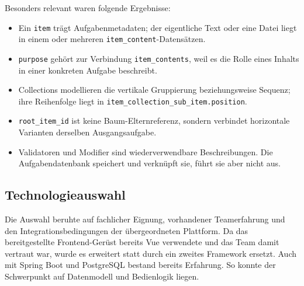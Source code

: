 \documentclass[11pt,a4paper]{article}
\begin{document}
Besonders relevant waren folgende Ergebnisse:
\begin{itemize}
\item Ein \texttt{item} trägt Aufgabenmetadaten; der eigentliche Text oder
eine Datei liegt in einem oder mehreren \texttt{item\_content}-Datensätzen.
\item \texttt{purpose} gehört zur Verbindung
\texttt{item\_contents}, weil es die Rolle eines Inhalts in einer konkreten
Aufgabe beschreibt.
\item Collections modellieren die vertikale Gruppierung beziehungsweise
Sequenz; ihre Reihenfolge liegt in
\texttt{item\_collection\_sub\_item.position}.
\item \texttt{root\_item\_id} ist keine Baum-Elternreferenz, sondern verbindet
horizontale Varianten derselben Ausgangsaufgabe.
\item Validatoren und Modifier sind wiederverwendbare Beschreibungen. Die
Aufgabendatenbank speichert und verknüpft sie, führt sie aber nicht aus.
\end{itemize}

\subsection{Technologieauswahl}
Die Auswahl beruhte auf fachlicher Eignung, vorhandener Teamerfahrung und den
Integrationsbedingungen der übergeordneten Plattform. Da das bereitgestellte
Frontend-Gerüst bereits Vue verwendete und das Team damit vertraut war, wurde
es erweitert statt durch ein zweites Framework ersetzt. Auch mit Spring Boot
und PostgreSQL bestand bereits Erfahrung. So konnte der Schwerpunkt auf
Datenmodell und Bedienlogik liegen.
\end{document}
